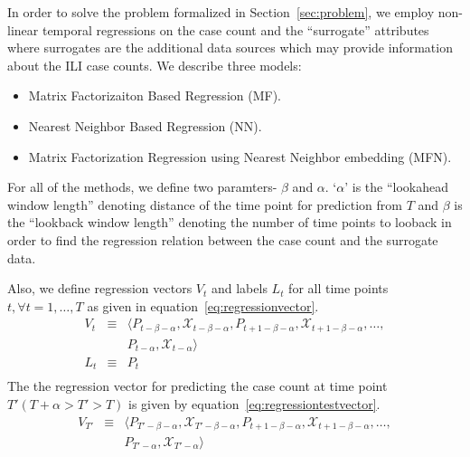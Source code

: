 
In order to solve the problem formalized in Section~\ref{sec:problem}, we employ
non-linear temporal regressions on the case count and the ``surrogate'' attributes
where surrogates are the additional data sources which may provide information about the
ILI case counts. 
We describe three models:
\begin{itemize}
  \item Matrix Factorizaiton Based Regression (MF).
  \item Nearest Neighbor Based Regression (NN).
  \item Matrix Factorization Regression using Nearest Neighbor embedding (MFN).
\end{itemize}
For all of the methods, we define two paramters- $\beta$ and $\alpha$. 
`$\alpha$' is the ``lookahead window length'' denoting distance of the time point for prediction from $T$ 
 and $\beta$ is the ``lookback window length'' denoting the number of time points to looback
in order to find the regression relation between the case count and the surrogate 
data.

Also, we define regression vectors $V_t$  and 
labels $L_t$ for all time points $t, \forall t = 1,\dots, T$
as given in equation~\ref{eq:regressionvector}.
\begin{equation}
  \label{eq:regressionvector}
  \begin{array}{lcl}
    V_t & \equiv & \langle P_{t-\beta - \alpha}, \mathcal{X}_{t-\beta - \alpha}, P_{t + 1 -\beta-\alpha}, \mathcal{X}_{t + 1 - \beta-\alpha}, \dots, \\
        &        & P_{t-\alpha},\mathcal{X}_{t-\alpha} \rangle \\
    L_t & \equiv & P_{t}\\
  \end{array}
\end{equation}
The the regression vector for predicting the case count at time point $T' (T +
\alpha > T' > T)$ is given by equation~\ref{eq:regressiontestvector}.
\begin{equation}
  \label{eq:regressiontestvector}
  \begin{array}{lcl}
    V_{T'} & \equiv & \langle P_{T'-\beta - \alpha}, \mathcal{X}_{T'-\beta - \alpha}, P_{t + 1 -\beta-\alpha}, \mathcal{X}_{t + 1 - \beta-\alpha}, \dots, \\
           &        & P_{T'-\alpha},\mathcal{X}_{T'-\alpha} \rangle \\
  \end{array}
\end{equation}

